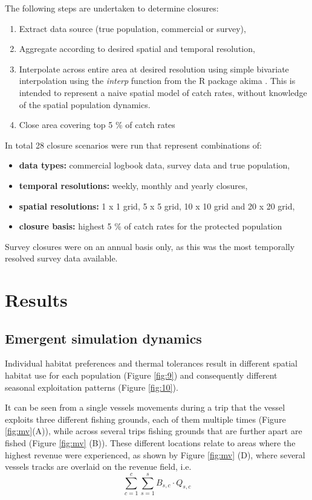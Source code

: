 \documentclass[review]{elsarticle}
\begin{document}
The following steps are undertaken to determine closures:

\begin{enumerate}
	\item Extract data source (true population, commercial or survey), 
	\item Aggregate according to desired spatial and temporal resolution,
	\item Interpolate across entire area at desired resolution using simple
		bivariate interpolation using the \emph{interp} function from
		the R package akima \citep{Akima2006}. This is intended to
		represent a naive spatial model of catch rates, without
		knowledge of the spatial population dynamics.
	\item Close area covering top 5 \% of catch rates 
\end{enumerate}
In total 28 closure scenarios were run that represent combinations of:

\begin{itemize}
	\item \textbf{data types:} commercial logbook data, survey data and
		true population,
	\item \textbf{temporal resolutions:} weekly, monthly and yearly
		closures,
	\item \textbf{spatial resolutions:} 1 x 1 grid, 5 x 5 grid, 10 x 10
		grid and 20 x 20 grid,
	\item \textbf{closure basis:} highest 5 \%  of catch rates for the
		protected population
\end{itemize}

Survey closures were on an annual basis only, as this was the most temporally
resolved survey data available.

\section{Results}

\subsection{Emergent simulation dynamics}

Individual habitat preferences and thermal tolerances result in different
spatial habitat use for each population (Figure \ref{fig:9}) and consequently
different seasonal exploitation patterns (Figure \ref{fig:10}). 

It can be seen from a single vessels movements during a trip that the vessel
exploits three different fishing grounds, each of them multiple times (Figure
\ref{fig:mv}(A)), while across several trips fishing grounds that are further
apart are fished (Figure \ref{fig:mv} (B)). These different locations relate to
areas where the highest revenue were experienced, as shown by Figure
\ref{fig:mv} (D), where several vessels tracks are overlaid on the revenue
field, i.e. $$\sum^c_{c=1}\sum^s_{s=1} B_{s,c} \cdot Q_{s,c}$$
\end{document}
